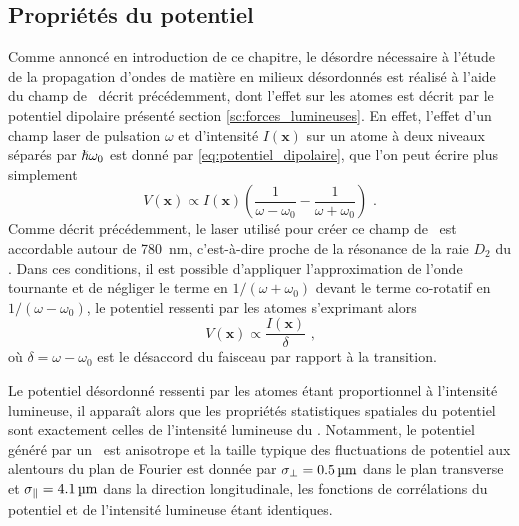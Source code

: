 \subsection{Propriétés du potentiel}
\label{sc:propriete_potentiel_speckle}
Comme annoncé en introduction de ce chapitre, le désordre nécessaire à l'étude de la propagation d'ondes de matière en milieux désordonnés est réalisé à l'aide du champ de \speckle\ décrit précédemment, dont l'effet sur les atomes est décrit par le potentiel dipolaire présenté section \ref{sc:forces_lumineuses}. En effet, l'effet d'un champ laser de pulsation $\omega$ et d'intensité $I(\mathbf{x})$ sur un atome à deux niveaux séparés par $\hslash \omega_0$ est donné par \ref{eq:potentiel_dipolaire}, que l'on peut écrire plus simplement 
\begin{equation}
V(\mathbf{x}) \propto I(\mathbf{x}) \left( \frac{1}{\omega-\omega_0} - \frac{1}{\omega+\omega_0} \right) \text{ .}
\end{equation}
Comme décrit précédemment, le laser utilisé pour créer ce champ de \speckle\ est accordable autour de \SI{780}{\nano\metre}, c'est-à-dire proche de la résonance de la raie $D_2$ du . Dans ces conditions, il est possible d'appliquer l'approximation de l'onde tournante et de négliger le terme en $1/(\omega+\omega_0)$ devant le terme co-rotatif en $1/(\omega-\omega_0)$, le potentiel ressenti par les atomes s'exprimant alors
\begin{equation}
V(\mathbf{x}) \propto \frac{I(\mathbf{x})}{\delta} \text{ ,}
\label{eq:potentiel_dipolaire_approx}
\end{equation}
où $\delta=\omega-\omega_0$ est le désaccord du faisceau par rapport à la transition. 

Le potentiel désordonné ressenti par les atomes étant proportionnel à l'intensité lumineuse, il apparaît alors que les propriétés statistiques spatiales du potentiel sont exactement celles de l'intensité lumineuse du \speckle . Notamment, le potentiel généré par un \speckle\ est anisotrope et la taille typique des fluctuations de potentiel aux alentours du plan de Fourier est donnée par $\sigma_{\perp}=\SI{0.5}{\micro\metre}$ dans le plan transverse et $\sigma_{\parallel}=\SI{4.1}{\micro\metre}$ dans la direction longitudinale, les fonctions de corrélations du potentiel et de l'intensité lumineuse étant identiques.

